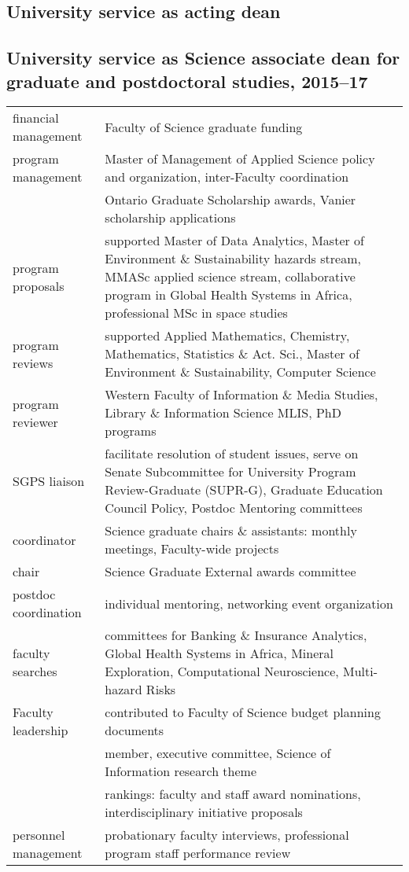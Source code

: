 \subsection{University service as acting dean}

\subsection{University service as Science associate dean for graduate and postdoctoral studies, 2015--17}

\begin{tabularx}{\textwidth}{lX}
financial management & Faculty of Science graduate funding  \\
program management & Master of Management of Applied Science policy and organization, inter-Faculty coordination   \\
  & Ontario Graduate Scholarship awards, Vanier scholarship applications \\
program proposals &  supported Master of Data Analytics, Master of Environment \& Sustainability hazards stream, MMASc applied science stream, collaborative program in Global Health Systems in Africa, professional MSc in space studies  \\
program reviews & supported Applied Mathematics, Chemistry, Mathematics, Statistics \& Act. Sci., Master of Environment \& Sustainability, Computer Science  \\
program reviewer & Western Faculty of Information \& Media Studies, Library \& Information Science MLIS, PhD programs  \\
SGPS liaison  &  facilitate resolution of student issues, serve on Senate Subcommittee for University Program Review-Graduate (SUPR-G), Graduate Education Council Policy, Postdoc Mentoring committees  \\
coordinator & Science graduate chairs \& assistants: monthly meetings, Faculty-wide projects \\
chair & Science Graduate External awards committee  \\
postdoc coordination & individual mentoring, networking event organization  \\ 
faculty searches &  committees for  Banking \& Insurance Analytics, Global Health Systems in Africa, Mineral Exploration, Computational Neuroscience, Multi-hazard Risks  \\
Faculty leadership & contributed to Faculty of Science budget planning documents  \\
& member, executive committee, Science of Information research theme  \\
& rankings: faculty and staff award nominations, interdisciplinary initiative proposals  \\
personnel management & probationary faculty interviews, professional program staff performance review  \\

\end{tabularx}


